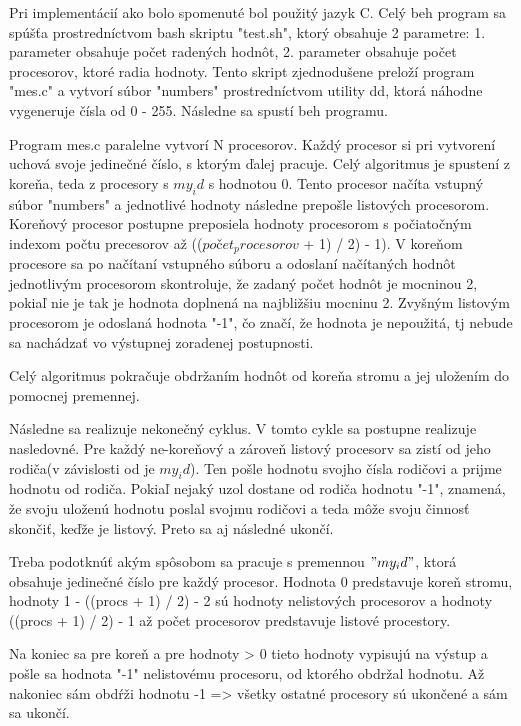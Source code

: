 \documentclass[12pt,a4paper,titlepage,final]{article}
\begin{document}
Pri implementácií ako bolo spomenuté bol použitý jazyk C. Celý beh program sa spúšťa prostredníctvom bash skriptu "test.sh", ktorý obsahuje 2 parametre: 1. parameter obsahuje počet radených hodnôt, 2. parameter obsahuje počet procesorov, ktoré radia hodnoty. Tento skript zjednodušene preloží program "mes.c" a vytvorí súbor "numbers" prostredníctvom utility dd, ktorá náhodne vygeneruje čísla od 0 - 255. Následne sa spustí beh programu.

Program mes.c paralelne vytvorí N procesorov. Každý procesor si pri vytvorení uchová svoje jedinečné číslo, s ktorým ďalej pracuje. Celý algoritmus je spustení z koreňa, teda z procesory s $my_id$ s hodnotou 0. Tento procesor načíta vstupný súbor "numbers" a jednotlivé hodnoty následne prepošle listových procesorom. Koreňový procesor postupne preposiela hodnoty procesorom s počiatočným indexom počtu precesorov až (($počet_procesorov$ + 1) / 2) - 1). V koreňom procesore sa po načítaní vstupného súboru a odoslaní načítaných hodnôt jednotlivým procesorom skontroluje, že zadaný počet hodnôt je mocninou 2, pokiaľ nie je tak je hodnota doplnená na najbližšiu mocninu 2. Zvyšným listovým procesorom je odoslaná hodnota "-1", čo značí, že hodnota je nepoužitá, tj nebude sa nachádzať vo výstupnej zoradenej postupnosti.

Celý algoritmus pokračuje obdržaním hodnôt od koreňa stromu a jej uložením do pomocnej premennej.

Následne sa realizuje nekonečný cyklus. V tomto cykle sa postupne realizuje nasledovné. Pre každý ne-koreňový a zároveň listový procesorv sa zistí od jeho rodiča(v závislosti od je $my_id$). Ten pošle hodnotu svojho čísla rodičovi a prijme hodnotu od rodiča. Pokiaľ nejaký uzol dostane od rodiča hodnotu "-1", znamená,  že svoju uloženú hodnotu poslal svojmu rodičovi a teda môže svoju činnosť skončiť, keďže je listový. Preto sa aj následné ukončí.

Treba podotknúť akým spôsobom sa pracuje s premennou $"my_id"$, ktorá obsahuje jedinečné číslo pre každý procesor. Hodnota 0 predstavuje koreň stromu, hodnoty 1 - ((procs + 1) / 2) - 2 sú hodnoty nelistových procesorov a hodnoty ((procs + 1) / 2) - 1 až počet procesorov predstavuje listové procestory.




Na koniec sa pre koreň a pre hodnoty > 0 tieto hodnoty vypisujú na výstup a pošle sa hodnota "-1" nelistovému procesoru, od ktorého obdržal hodnotu. Až nakoniec sám obdŕži hodnotu -1 => všetky ostatné procesory sú ukončené a sám sa ukončí.
\end{document}
